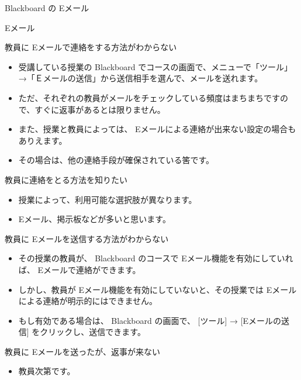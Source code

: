 \documentclass[a4j,10pt]{jsarticle}
\begin{document}
{\newpage\clearpage
{}%
\begin{frame}[label={sec:orgff2a9df},fragile]{Blackboard の Eメール}
\begin{block}{Eメール}
\begin{block}{教員に Eメールで連絡をする方法がわからない}
\begin{itemize}
\item 受講している授業の Blackboard でコースの画面で、メニューで「ツール」→「Ｅメールの送信」から送信相手を選んで、メールを送れます。
\item ただ、それぞれの教員がメールをチェックしている頻度はまちまちですので、すぐに返事があるとは限りません。
\item また、授業と教員によっては、 Eメールによる連絡が出来ない設定の場合もありえます。
\item その場合は、他の連絡手段が確保されている筈です。
\end{itemize}
\end{block}
\par
\begin{block}{教員に連絡をとる方法を知りたい}
\begin{itemize}
\item 授業によって、利用可能な選択肢が異なります。
\item Eメール、掲示板などが多いと思います。
\end{itemize}
\end{block}
\par
\begin{block}{教員に Eメールを送信する方法がわからない}
\begin{itemize}
\item その授業の教員が、 Blackboard のコースで Eメール機能を有効にしていれば、 Eメールで連絡ができます。
\item しかし、教員が Eメール機能を有効にしていないと、その授業では Eメールによる連絡が明示的にはできません。
\item もし有効である場合は、 Blackboard の画面で、 [ツール] → [Eメールの送信] をクリックし、送信できます。
\end{itemize}
\end{block}
\par
\begin{block}{教員に Eメールを送ったが、返事が来ない}
\begin{itemize}
\item 教員次第です。
\end{itemize}
\end{block}
\par

\end{block}
\end{frame}}
\end{document}

